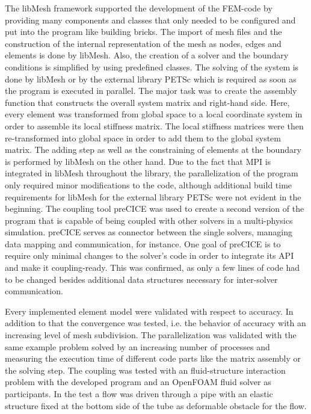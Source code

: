   The libMesh framework supported the development of the FEM-code by providing many components and classes that only needed to be configured and put into the program like building bricks. The import of mesh files and the construction of the internal representation of the mesh as nodes, edges and elements is done by libMesh. Also, the creation of a solver and the boundary conditions is simplified by using predefined classes. The solving of the system is done by libMesh or by the external library PETSc which is required as soon as the program is executed in parallel. The major task was to create the assembly function that constructs the overall system matrix and right-hand side. Here, every element was transformed from global space to a local coordinate system in order to assemble its local stiffness matrix. The local stiffness matrices were then re-transformed into global space in order to add them to the global system matrix. The adding step as well as the constraining of elements at the boundary is performed by libMesh on the other hand. Due to the fact that MPI is integrated in libMesh throughout the library, the parallelization of the program only required minor modifications to the code, although additional build time requirements for libMesh for the external library PETSc were not evident in the beginning.
  The coupling tool preCICE was used to create a second version of the program that is capable of being coupled with other solvers in a multi-physics simulation. preCICE serves as connector between the single solvers, managing data mapping and communication, for instance. One goal of preCICE is to require only minimal changes to the solver's code in order to integrate its API and make it coupling-ready. This was confirmed, as only a few lines of code had to be changed besides additional data structures necessary for inter-solver communication.

  Every implemented element model were validated with respect to accuracy. In addition to that the convergence was tested, i.e. the behavior of accuracy with an increasing level of mesh subdivision. The parallelization was validated with the same example problem solved by an increasing number of processes and measuring the execution time of different code parts like the matrix assembly or the solving step. The coupling was tested with an fluid-structure interaction problem with the developed program and an OpenFOAM fluid solver as participants. In the test a flow was driven through a pipe with an elastic structure fixed at the bottom side of the tube as deformable obstacle for the flow.
 
